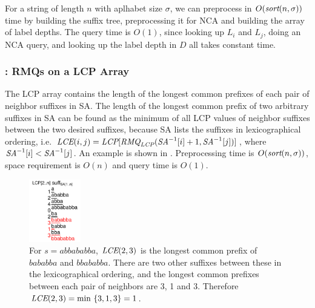 \documentclass[a4]{article}
\newcommand*{\pref}{\prettyref}
\begin{document}
For a string of length $n$ with aplhabet size $\sigma$, we can preprocess  in $O(\textit{sort}(n,\sigma))$ time by building the suffix tree, preprocessing it for NCA and building the array of label depths. The query time is $O(1)$, since looking up $L_i$ and $L_j$, doing an NCA query, and looking up the label depth in $D$ all takes constant time.

\subsubsection{: RMQs on a LCP Array}

The LCP array contains the length of the longest common prefixes of each pair of neighbor suffixes in SA. The length of the longest common prefix of two arbitrary suffixes in SA can be found as the minimum of all LCP values of neighbor suffixes between the two desired suffixes, because SA lists the suffixes in lexicographical ordering, i.e. $\textit{LCE}(i,j)=\textit{LCP}[\textit{RMQ}_{\textit{LCP}}(\textit{SA}^{-1}[i] + 1, \textit{SA}^{-1}[j])]$, where $\textit{SA}^{-1}[i] < \textit{SA}^{-1}[j]$. An example is shown in \pref{fig:sa+lcp+min}. Preprocessing time is $O(\textit{sort}(n,\sigma))$, space requirement is $O(n)$ and query time is $O(1)$.

\begin{figure}[tp]
    \begin{center}
        \includegraphics[width=0.2\textwidth,page=1]{sa+lcp+min.pdf}
    \end{center}
    \caption{\label{fig:sa+lcp+min}For $s=abbababba$, $\textit{LCE}(2,3)$ is the longest common prefix of $bababba$ and $bbababba$. There are two other suffixes between these in the lexicographical ordering, and the longest common prefixes between each pair of neighbors are 3, 1 and 3. Therefore $\textit{LCE}(2,3)= \min ~ \{3, 1, 3\} = 1$.}
\end{figure}
\end{document}
